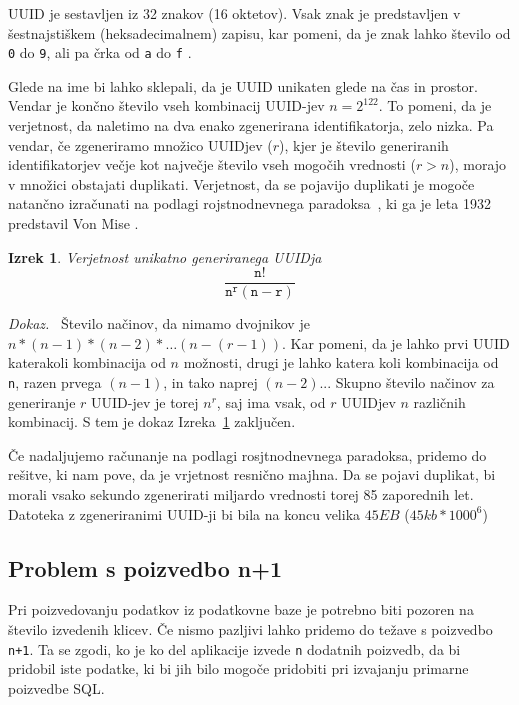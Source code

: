 \documentclass[a4paper, 12pt]{book}
\newtheorem{izrek}{Izrek}[chapter]
\newenvironment{dokaz}{\emph{Dokaz.}\ }{\hspace{\fill}{$\Box$}}
\begin{document}
UUID je sestavljen iz 32 znakov (16 oktetov). Vsak znak je predstavljen v šestnajstiškem (heksadecimalnem) zapisu, kar pomeni, da je znak lahko število od \verb=0= do \verb=9=, ali pa črka od \verb=a= do \verb=f= \cite{uuid-rfc}.

Glede na ime bi lahko sklepali, da je UUID unikaten glede na čas in prostor. Vendar je končno število vseh kombinacij UUID-jev $n=2^{122}$. To pomeni, da je verjetnost, da naletimo na dva enako zgenerirana identifikatorja, zelo nizka.
Pa vendar, če zgeneriramo množico UUIDjev ($r$), kjer je število generiranih identifikatorjev večje kot največje število vseh mogočih vrednosti ($r > n$), morajo v množici obstajati duplikati. Verjetnost, da se pojavijo duplikati je mogoče natančno izračunati na podlagi rojstnodnevnega paradoksa~\cite{birthday-problem-what-is}, ki ga je leta 1932 predstavil Von Mise \cite{birthday-problem-inventor}.

\begin{izrek}
\label{iz:1}
Verjetnost unikatno generiranega UUIDja
\begin{equation}
\mathtt{\frac{n!}{n^{r}(n-r)}}
\label{eq:1}
\end{equation}
\end{izrek}

\begin{dokaz}
Število načinov, da nimamo dvojnikov je $n*(n-1)*(n-2)* …(n-(r-1))$. Kar pomeni, da je lahko prvi UUID katerakoli kombinacija od $n$ možnosti, drugi je lahko katera koli kombinacija od \verb=n=, razen prvega $(n-1)$, in tako naprej $(n-2)$... Skupno število načinov za generiranje $r$ UUID-jev je torej $n^r$, saj ima vsak, od $r$ UUIDjev $n$ različnih kombinacij.
S tem je dokaz Izreka~\ref{iz:1} zaključen.
\end{dokaz}

Če nadaljujemo računanje na podlagi rosjtnodnevnega paradoksa, pridemo do rešitve, ki nam pove, da je vrjetnost resnično majhna. Da se pojavi duplikat, bi morali vsako sekundo zgenerirati miljardo vrednosti torej 85 zaporednih let. Datoteka z zgeneriranimi UUID-ji bi bila na koncu velika $45EB$ ($45kb*1000^6$) \cite{uuid-collisions}

\subsection{Problem s poizvedbo n+1}
Pri poizvedovanju podatkov iz podatkovne baze je potrebno biti pozoren na število izvedenih klicev. Če nismo pazljivi lahko pridemo do težave s poizvedbo \verb=n+1=. Ta se zgodi, ko je ko del aplikacije izvede \verb=n= dodatnih poizvedb, da bi pridobil iste podatke, ki bi jih bilo mogoče pridobiti pri izvajanju primarne poizvedbe SQL.
\end{document}
